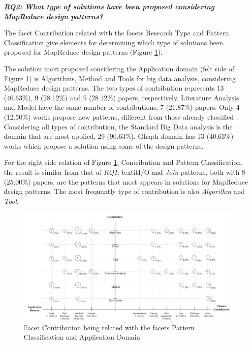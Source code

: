\bigskip
\textbf{\textit{RQ2: What type of solutions have been proposed considering
MapReduce design patterns?}}

The facet Contribution related with the facets Research Type and Pattern
Classification give elements for determining which type of solutions been
proposed for MapReduce design patterns (Figure
\ref{fig:contribution-patterns-domain}).

The solution most proposed considering the Application domain (felt side of
Figure \ref{fig:contribution-patterns-domain}) is Algorithms, Method and Tools
for big data analysis, considering MapReduce design patterns. The two types of
contribution represents 13 (40.63\%), 9 (28.12\%) and 9 (28.12\%) papers,
respectively. Literature Analysis and Model have the same number of
contributions, 7 (21.87\%) papers. Only 4 (12.50\%) works propose new patterns,
different from those already classified
\cite{White:2012,pig-designpattern:2014}. Considering all types of contribution,
the Standard Big Data analysis is the domain that are most applied, 29
(90.63\%). Ghaph domain has 13 (40.63\%) works which propose a solution using
some of the design patterns.

For the right side relation of Figure \ref{fig:contribution-patterns-domain},
Contribution and Pattern Classification, the result is similar from that of
\textit{RQ1}. textit{I/O} and \textit{Join} patterns, both with 8 (25.00\%)
papers, are the patterns that most appears in solutions for MapReduce design
patterns. The most frequantly type of contribution is also \textit{Algorithm}
and \textit{Tool}.

\begin{figure}[hbtp]
\centering
\includegraphics[width=0.99\textwidth]{figs/Contribution-Patterns-Domain.pdf}
\caption{Facet Contribution being related with the facets Pattern
Classification and Application Domain}
\label{fig:contribution-patterns-domain}
\end{figure}

